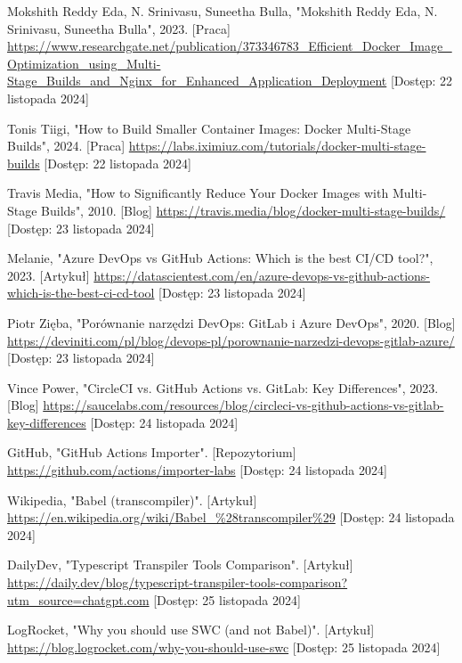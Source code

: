 \documentclass{article}
\begin{document}
\begin{thebibliography}{9}
Mokshith Reddy Eda, N. Srinivasu, Suneetha Bulla, "Mokshith Reddy Eda, N. Srinivasu, Suneetha Bulla", 2023. [Praca] \url{https://www.researchgate.net/publication/373346783_Efficient_Docker_Image_Optimization_using_Multi-Stage_Builds_and_Nginx_for_Enhanced_Application_Deployment} [Dostęp: 22 listopada 2024]

Tonis Tiigi, "How to Build Smaller Container Images: Docker Multi-Stage Builds", 2024. [Praca] \url{https://labs.iximiuz.com/tutorials/docker-multi-stage-builds} [Dostęp: 22 listopada 2024]

Travis Media, "How to Significantly Reduce Your Docker Images with Multi-Stage Builds", 2010. [Blog] \url{https://travis.media/blog/docker-multi-stage-builds/} [Dostęp: 23 listopada 2024]

Melanie, "Azure DevOps vs GitHub Actions: Which is the best CI/CD tool?", 2023. [Artykuł] \url{https://datascientest.com/en/azure-devops-vs-github-actions-which-is-the-best-ci-cd-tool} [Dostęp: 23 listopada 2024]

Piotr Zięba, "Porównanie narzędzi DevOps: GitLab i Azure DevOps", 2020. [Blog] \url{https://deviniti.com/pl/blog/devops-pl/porownanie-narzedzi-devops-gitlab-azure/} [Dostęp: 23 listopada 2024]

Vince Power, "CircleCI vs. GitHub Actions vs. GitLab: Key Differences", 2023. [Blog] \url{https://saucelabs.com/resources/blog/circleci-vs-github-actions-vs-gitlab-key-differences} [Dostęp: 24 listopada 2024]

GitHub, "GitHub Actions Importer". [Repozytorium] \url{https://github.com/actions/importer-labs} [Dostęp: 24 listopada 2024]

Wikipedia, "Babel (transcompiler)". [Artykuł] \url{https://en.wikipedia.org/wiki/Babel_%28transcompiler%29} [Dostęp: 24 listopada 2024]

DailyDev, "Typescript Transpiler Tools Comparison". [Artykuł] \url{https://daily.dev/blog/typescript-transpiler-tools-comparison?utm_source=chatgpt.com} [Dostęp: 25 listopada 2024]

LogRocket, "Why you should use SWC (and not Babel)". [Artykuł] \url{https://blog.logrocket.com/why-you-should-use-swc} [Dostęp: 25 listopada 2024]


\end{thebibliography}
\end{document}
